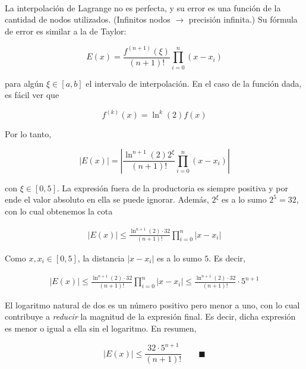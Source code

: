 \documentclass[12pt]{article}
\begin{document}
~

La interpolación de Lagrange no es perfecta, y su error es una función de la
cantidad de nodos utilizados. (Infinitos nodos $\to $ precisión infinita.) Su
fórmula de error es similar a la de Taylor:

\begin{equation*}
    E(x) = \frac{f^{(n+1)}(\xi)}{(n+1)!} \prod_{i=0}^n(x-x_i)
\end{equation*}

para algún $\xi \in [a, b]$ el intervalo de interpolación. En el caso de la función dada, es fácil ver que

\begin{equation*}
    f^{(k)}(x) = \ln^k(2) f(x)
\end{equation*}

Por lo tanto, 

\begin{equation*}
    \left| E(x) \right| = \left| \frac{\ln^{n+1}(2) 2^\xi}{(n+1)!}
    \prod_{i=0}^n(x-x_i) \right| 
\end{equation*}

con $\xi \in [0, 5]$. La expresión fuera de la productoria es siempre positiva y
por ende el valor absoluto en ella se puede ignorar. Además, $2^\xi$ es a lo
sumo $2^5 = 32$, con lo cual obtenemos la cota 

\begin{align*}
    \left| E(x) \right| \leq \frac{\ln^{n+1}(2) \cdot 32}{(n+1)!} 
    \prod_{i=0}^n\left|x-x_i \right| 
\end{align*}

Como $x, x_i \in [0, 5]$, la distancia $\left| x - x_i \right| $ es a lo sumo
$5$. Es decir,


\begin{align*}
    \left| E(x) \right| \leq 
    \frac{\ln^{n+1}(2) \cdot 32}{(n+1)!} 
    \prod_{i=0}^n\left|x-x_i \right| \leq 
    \frac{\ln^{n+1}(2) \cdot 32}{(n+1)!} 
    \cdot 5^{n+1}
\end{align*}

El logaritmo natural de dos es un número positivo pero menor a uno, con lo cual
contribuye a \textit{reducir} la magnitud de la expresión final. Es decir, dicha
expresión es menor o igual a ella sin el logaritmo. En resumen, 

\begin{equation*}
    \left| E(x) \right| \leq \frac{32 \cdot 5^{n+1}}{(n+1)!} \qquad \blacksquare
\end{equation*}
\end{document}
